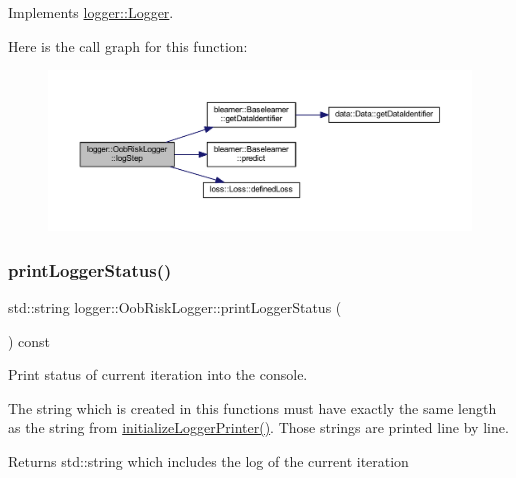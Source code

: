 Implements \mbox{\hyperlink{classlogger_1_1_logger_a91d987a86698e455b6fd3468f266d3fe}{logger\+::\+Logger}}.

Here is the call graph for this function\+:\nopagebreak
\begin{figure}[H]
\begin{center}
\leavevmode
\includegraphics[width=350pt]{classlogger_1_1_oob_risk_logger_a948a89f02ac782c25a15c49c4a108c02_cgraph}
\end{center}
\end{figure}
\mbox{\label{classlogger_1_1_oob_risk_logger_acab1638b5112232c86c2208b91f649fb}} 
\subsubsection{\texorpdfstring{print\+Logger\+Status()}{printLoggerStatus()}}
{\footnotesize\ttfamily std\+::string logger\+::\+Oob\+Risk\+Logger\+::print\+Logger\+Status (\begin{DoxyParamCaption}{ }\end{DoxyParamCaption}) const\hspace{0.3cm}{\ttfamily [virtual]}}



Print status of current iteration into the console. 

The string which is created in this functions must have exactly the same length as the string from {\ttfamily \mbox{\hyperlink{classlogger_1_1_oob_risk_logger_afb230d22eea9b1c025e6ff95685c692c}{initialize\+Logger\+Printer()}}}. Those strings are printed line by line.

\begin{DoxyReturn}{Returns}
{\ttfamily std\+::string} which includes the log of the current iteration 
\end{DoxyReturn}


